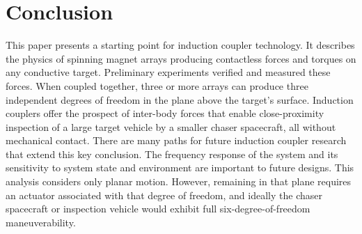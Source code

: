 \section{Conclusion}
This paper presents a starting point for induction coupler technology. It describes the physics of spinning magnet arrays producing contactless forces and torques on any conductive target. Preliminary experiments verified and measured these forces. When coupled together, three or more arrays can produce three independent degrees of freedom in the plane above the target's surface.
Induction couplers offer the prospect of inter-body forces that enable close-proximity inspection of a large target vehicle by a smaller chaser spacecraft, all without mechanical contact. There are many paths for future induction coupler research that extend this key conclusion. The frequency response of the system and its sensitivity to system state and environment are important to future designs. This analysis considers only planar motion. However, remaining in that plane requires an actuator associated with that degree of freedom, and ideally the chaser spacecraft or inspection vehicle would exhibit full six-degree-of-freedom maneuverability.
